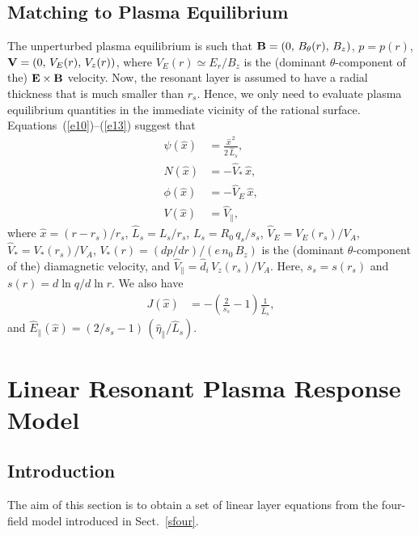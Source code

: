 \documentclass[12pt,prb,aps]{revtex4-1}
\begin{document}
\subsection{Matching to Plasma Equilibrium}
The unperturbed plasma equilibrium is such that
${\bf B} = (0,\,B_\theta(r),\,B_z)$,  $p = p(r)$,
${\bf V} = (0,\,V_E(r),\,V_z(r))$,
where 
$V_E(r)\simeq E_r/B_z$
 is the (dominant $\theta$-component of the) ${\bf E}\times {\bf B}$ velocity. Now, the resonant layer is assumed to have a radial thickness that is
much smaller than $r_s$.   Hence, we only need to evaluate plasma equilibrium quantities in the immediate vicinity of the rational
surface. Equations~(\ref{e10})--(\ref{e13}) suggest that 
\begin{align}
\psi(\hat{x})&= \frac{\hat{x}^{\,2}}{2\,\hat{L}_s},\label{e23}\\[0.5ex]
N(\hat{x}) &= -\hat{V}_\ast\,\hat{x},\\[0.5ex]
\phi(\hat{x}) &= - \hat{V}_E\,\hat{x},\\[0.5ex]
V (\hat{x})&= \hat{V}_\parallel,\label{e26}
\end{align}
where 
$\hat{x}=(r-r_s)/r_s$,
 $\hat{L}_s=L_s/r_s$,  $L_s=R_0\,q_s/s_s$, 
  $\hat{V}_E= V_E(r_s)/V_A$,
$\hat{V}_\ast= V_\ast(r_s)/V_A$,
$V_\ast(r) = (dp/dr)/(e\,n_0\,B_z)$ 
is the (dominant $\theta$-component of the) diamagnetic velocity,
  and 
 $\hat{V}_\parallel=\hat{d}_i\, V_z(r_s)/V_A$. Here, $s_s=s(r_s)$ and $s(r)=d\ln q/d\ln r$. We also have
 \begin{align}\label{e28}
 J (\hat{x})&= -\left(\frac{2}{s_s}-1\right)\frac{1}{\hat{L}_s},
\end{align} 
and $ \hat{E}_\parallel(\hat{x}) =(2/s_s-1)\, (\hat{\eta}_\parallel/\hat{L}_s)$.

\section{Linear Resonant Plasma Response Model}\label{layer}
\subsection{Introduction}
The aim of this section is to obtain a set of linear layer equations from the four-field model
introduced in Sect.~\ref{sfour}.
\end{document}
